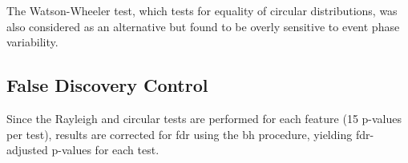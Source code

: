 The Watson-Wheeler test, which tests for equality of circular distributions, was also considered as an alternative but found to be overly sensitive to event phase variability.

\subsection{False Discovery Control} \label{subsec:fdr}
Since the Rayleigh and circular tests are performed for each feature (15 p-values per test), results are corrected for \gls{fdr} using the \gls{bh} procedure, yielding \gls{fdr}-adjusted p-values for each test.
